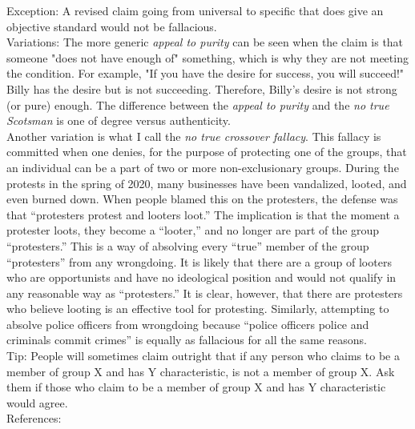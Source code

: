 \documentclass[a4paper,12pt,single,pdftex]{scrartcl}
\begin{document}
    
      Exception: A revised claim going from universal to specific that does give an objective standard would not be fallacious.
    \\

    
      Variations: The more generic {\it appeal to purity} can be seen when the claim is that someone "does not have enough of" something, which is why they are not meeting the condition. For example, "If you have the desire for success, you will succeed!" Billy has the desire but is not succeeding. Therefore, Billy's desire is not strong (or pure) enough. The difference between the {\it appeal to purity} and the {\it no true Scotsman} is one of degree versus authenticity.
    \\

    
      Another variation is what I call the {\em no true crossover fallacy}. This fallacy is committed when one denies, for the purpose of protecting one of the groups, that an individual can be a part of two or more non-exclusionary groups. During the protests in the spring of 2020, many businesses have been vandalized, looted, and even burned down. When people blamed this on the protesters, the defense was that “protesters protest and looters loot.” The implication is that the moment a protester loots, they become a “looter,” and no longer are part of the group “protesters.” This is a way of absolving every “true” member of the group “protesters” from any wrongdoing. It is likely that there are a group of looters who are opportunists and have no ideological position and would not qualify in any reasonable way as “protesters.” It is clear, however, that there are protesters who believe looting is an effective tool for protesting. Similarly, attempting to absolve police officers from wrongdoing because “police officers police and criminals commit crimes” is equally as fallacious for all the same reasons.
    \\

    
      Tip: People will sometimes claim outright that if any person who claims to be a member of group X and has Y characteristic, is not a member of group X. Ask them if those who claim to be a member of group X and has Y characteristic would agree.
    \\

    References:

    
      
        
      \\

      
        
\end{document}

